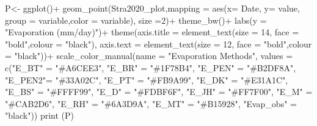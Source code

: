 \documentclass[
]{article}
\newenvironment{Shaded}{\begin{snugshade}}{\end{snugshade}}
\newcommand{\AttributeTok}[1]{\textcolor[rgb]{0.77,0.63,0.00}{#1}}
\newcommand{\DecValTok}[1]{\textcolor[rgb]{0.00,0.00,0.81}{#1}}
\newcommand{\FunctionTok}[1]{\textcolor[rgb]{0.00,0.00,0.00}{#1}}
\newcommand{\NormalTok}[1]{#1}
\newcommand{\OtherTok}[1]{\textcolor[rgb]{0.56,0.35,0.01}{#1}}
\newcommand{\SpecialCharTok}[1]{\textcolor[rgb]{0.00,0.00,0.00}{#1}}
\newcommand{\StringTok}[1]{\textcolor[rgb]{0.31,0.60,0.02}{#1}}
\begin{document}
\begin{Shaded}
\begin{Highlighting}[]
\NormalTok{P}\OtherTok{\textless{}{-}} \FunctionTok{ggplot}\NormalTok{()}\SpecialCharTok{+}
  \FunctionTok{geom\_point}\NormalTok{(Stra2020\_plot,}\AttributeTok{mapping =} \FunctionTok{aes}\NormalTok{(}\AttributeTok{x=}\NormalTok{ Date, }\AttributeTok{y=}\NormalTok{ value,  }\AttributeTok{group =}\NormalTok{ variable,}\AttributeTok{color =}\NormalTok{ variable), }\AttributeTok{size =}\DecValTok{2}\NormalTok{)}\SpecialCharTok{+}
  \FunctionTok{theme\_bw}\NormalTok{()}\SpecialCharTok{+}
  \FunctionTok{labs}\NormalTok{(}\AttributeTok{y =} \StringTok{"Evaporation (mm/day)"}\NormalTok{)}\SpecialCharTok{+}
  \FunctionTok{theme}\NormalTok{(}\AttributeTok{axis.title =} \FunctionTok{element\_text}\NormalTok{(}\AttributeTok{size =} \DecValTok{14}\NormalTok{, }\AttributeTok{face =} \StringTok{"bold"}\NormalTok{,}\AttributeTok{colour =} \StringTok{"black"}\NormalTok{),}
        \AttributeTok{axis.text  =} \FunctionTok{element\_text}\NormalTok{(}\AttributeTok{size =} \DecValTok{12}\NormalTok{, }\AttributeTok{face =} \StringTok{"bold"}\NormalTok{,}\AttributeTok{colour =} \StringTok{"black"}\NormalTok{))}\SpecialCharTok{+}
  \FunctionTok{scale\_color\_manual}\NormalTok{(}\AttributeTok{name =} \StringTok{"Evaporation Methods"}\NormalTok{,}
                     \AttributeTok{values =} \FunctionTok{c}\NormalTok{(}\StringTok{"E\_BT"} \OtherTok{=} \StringTok{"\#A6CEE3"}\NormalTok{,}
                                \StringTok{"E\_BR"} \OtherTok{=} \StringTok{"\#1F78B4"}\NormalTok{,}
                                \StringTok{"E\_PEN"} \OtherTok{=} \StringTok{"\#B2DF8A"}\NormalTok{,}
                                \StringTok{"E\_PEN2"}\OtherTok{=} \StringTok{"\#33A02C"}\NormalTok{,}
                                \StringTok{"E\_PT"} \OtherTok{=} \StringTok{"\#FB9A99"}\NormalTok{,}
                                \StringTok{"E\_DK"} \OtherTok{=} \StringTok{"\#E31A1C"}\NormalTok{,}
                                \StringTok{"E\_BS"} \OtherTok{=} \StringTok{"\#FFFF99"}\NormalTok{,}
                                 \StringTok{"E\_D"} \OtherTok{=} \StringTok{"\#FDBF6F"}\NormalTok{,                     }
                                \StringTok{"E\_JH"} \OtherTok{=} \StringTok{"\#FF7F00"}\NormalTok{,  }
                               \StringTok{"E\_M"} \OtherTok{=} \StringTok{"\#CAB2D6"}\NormalTok{,}
                               \StringTok{"E\_RH"} \OtherTok{=} \StringTok{"\#6A3D9A"}\NormalTok{,                     }
                                \StringTok{"E\_MT"} \OtherTok{=} \StringTok{"\#B15928"}\NormalTok{,}
                               \StringTok{"Evap\_obs"} \OtherTok{=} \StringTok{"black"}\NormalTok{))}
\FunctionTok{print}\NormalTok{ (P)}
\end{Highlighting}
\end{Shaded}
\end{document}

